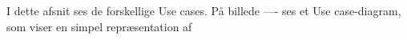 I dette afsnit ses de forskellige Use cases. På billede ---- ses et Use case-diagram, som viser en simpel repræsentation af 
\newpage
